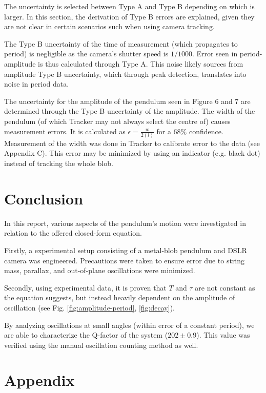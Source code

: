 \documentclass[prl,twocolumn,amsmath,amssymb,superscriptaddress]{revtex4-2}
\begin{document}
The uncertainty is selected between Type A and Type B depending on which is larger. In this section, the derivation of Type B errors are explained, given they are not clear in certain scenarios such when using camera tracking.

The Type B uncertainty of the time of measurement (which propagates to period) is negligible as the camera's shutter speed is $1/1000$. Error seen in period-amplitude is thus calculated through Type A. This noise likely sources from amplitude Type B uncertainty, which through peak detection, translates into noise in period data.

The uncertainty for the amplitude of the pendulum seen in Figure 6 and 7 are determined through the Type B uncertainty of the amplitude. The width of the pendulum (of which Tracker may not always select the centre of) causes measurement errors. It is calculated as $\epsilon = \frac{w}{2(l)}$ for a 68\% confidence. Measurement of the width was done in Tracker to calibrate error to the data (see Appendix C). This error may be minimized by using an indicator (e.g. black dot) instead of tracking the whole blob.

\section{Conclusion}
In this report, various aspects of the pendulum's motion were investigated in relation to the offered closed-form equation.

Firstly, a experimental setup consisting of a metal-blob pendulum and DSLR camera was engineered. Precautions were taken to ensure error due to string mass, parallax, and out-of-plane oscillations were minimized.

Secondly, using experimental data, it is proven that $T$ and $\tau$ are not constant as the equation suggests, but instead heavily dependent on the amplitude of oscillation (see Fig. \ref{fig:amplitude-period}, \ref{fig:decay}).

By analyzing oscillations at small angles (within error of a constant period), we are able to characterize the Q-factor of the system ($202\pm0.9$). This value was verified using the manual oscillation counting method as well.


\onecolumngrid

\newpage
\section{Appendix}
\end{document}
